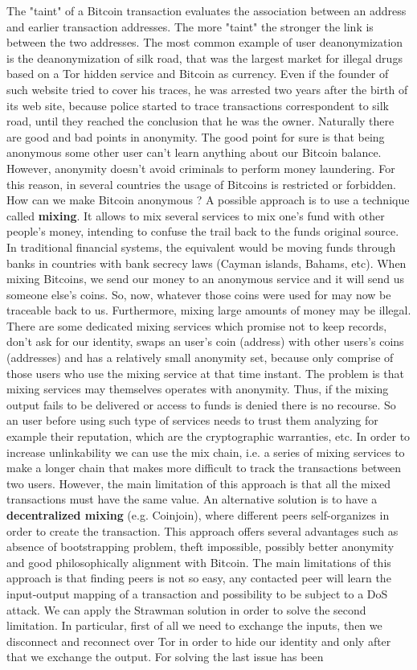 The "taint" of a Bitcoin transaction evaluates the association between an address and earlier transaction addresses. The more "taint" the stronger the link is between the two addresses. The most common example of user deanonymization is the deanonymization of silk road, that was the largest market for illegal drugs based on a Tor hidden service and Bitcoin as currency. Even if the founder of such website tried to cover his traces, he was arrested two years after the birth of its web site, because police started to trace transactions correspondent to silk road, until they reached the conclusion that he was the owner. Naturally there are good and bad points in anonymity. The good point for sure is that being anonymous some other user can't learn anything about our Bitcoin balance. However, anonymity doesn't avoid criminals to perform money laundering. For this reason, in several countries the usage of Bitcoins is restricted or forbidden. How can we make Bitcoin anonymous ? A possible approach is to use a technique called \textbf{mixing}. It allows to mix several services to mix one's fund with other people's money, intending to confuse the trail back to the funds original source. In traditional financial systems, the equivalent would be moving funds through banks in countries with bank secrecy laws (Cayman islands, Bahams, etc). When mixing Bitcoins, we send our money to an anonymous service and it will send us someone else's coins. So, now, whatever those coins were used for may now be traceable back to us. Furthermore, mixing large amounts of money may be illegal. There are some dedicated mixing services which promise not to keep records, don't ask for our identity, swaps an user's coin (address) with other users's coins (addresses) and has a relatively small anonymity set, because only comprise of those users who use the mixing service at that time instant. The problem is that mixing services may themselves operates with anonymity. Thus, if the mixing output fails to be delivered or access to funds is denied there is no recourse. So an user before using such type of services needs to trust them analyzing for example their reputation, which are the cryptographic warranties, etc. In order to increase unlinkability we can use the mix chain, i.e. a series of mixing services to make a longer chain that makes more difficult to track the transactions between two users. However, the main limitation of this approach is that all the mixed transactions must have the same value. An alternative solution is to have a \textbf{decentralized mixing} (e.g. Coinjoin), where different peers self-organizes in order to create the transaction. This approach offers several advantages such as absence of bootstrapping problem, theft impossible, possibly better anonymity and good philosophically alignment with Bitcoin. The main limitations of this approach is that finding peers is not so easy, any contacted peer will learn the input-output mapping of a transaction and possibility to be subject to a DoS attack. We can apply the Strawman solution in order to solve the second limitation. In particular, first of all we need to exchange the inputs, then we disconnect and reconnect over Tor in order to hide our identity and only after that we exchange the output. For solving the last issue has been 